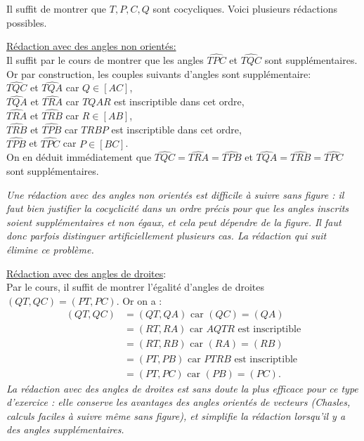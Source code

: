 \begin{exo}
\begin{sol}
Il suffit de montrer que $T, P, C, Q$ sont cocycliques. Voici plusieurs rédactions possibles.

\underline{Rédaction avec des angles non orientés:}\\
Il suffit par le cours de montrer que les angles $\widehat{TPC}$ et $\widehat{TQC}$ sont supplémentaires. Or par construction, les couples suivants d'angles sont supplémentaire: \\
$\widehat{TQC}$ et $\widehat{TQA}$ car $Q\in[AC]$,\\
$\widehat{TQA}$ et $\widehat{TRA}$ car $TQAR$ est inscriptible dans cet ordre,\\
$\widehat{TRA}$ et $\widehat{TRB}$ car $R\in[AB]$,\\
$\widehat{TRB}$ et $\widehat{TPB}$ car $TRBP$ est inscriptible dans cet ordre,\\
$\widehat{TPB}$ et $\widehat{TPC}$ car $P \in[BC]$.\\
On en déduit immédiatement que $\widehat{TQC}=\widehat{TRA}=\widehat{TPB}$ et $\widehat{TQA}=\widehat{TRB}=\widehat{TPC}$ sont supplémentaires.

\emph{Une rédaction avec des angles non orientés est difficile à suivre sans figure : il faut bien justifier la cocyclicité dans un ordre précis pour que les angles inscrits soient supplémentaires et non égaux, et cela peut dépendre de la figure. Il faut donc parfois distinguer artificiellement plusieurs cas. La rédaction qui suit élimine ce problème.}


\underline{Rédaction avec des angles de droites}:\\
Par le cours,  il suffit de montrer l'égalité d'angles de droites $(QT,QC)=(PT,PC)$. Or on a :
\begin{align*}
(QT,QC)&=(QT,QA) \text{ car $(QC)=(QA)$}\\
&=(RT,RA) \text{ car $AQTR$ est inscriptible} \\
&= (RT,RB) \text{ car $(RA)=(RB)$} \\
&=(PT,PB) \text{ car $PTRB$ est inscriptible} \\
&=(PT,PC) \text{ car $(PB)=(PC)$.}
\end{align*}
\emph{La rédaction avec des angles de droites est sans doute la plus efficace pour ce type d'exercice : elle conserve les avantages des angles orientés de vecteurs (Chasles, calculs faciles à suivre même sans figure), et simplifie la rédaction lorsqu'il y a des angles supplémentaires.}
\end{sol}
\end{exo}

